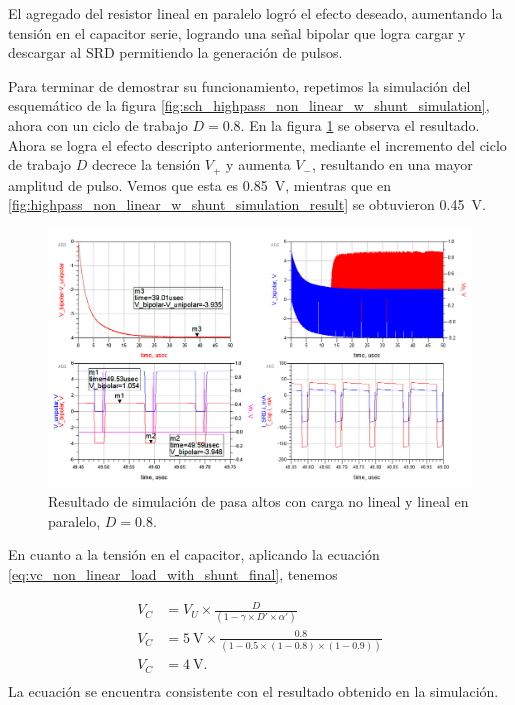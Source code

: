 El agregado del resistor lineal en paralelo logró el efecto deseado, aumentando
la tensión en el capacitor serie, logrando una señal bipolar que logra cargar y
descargar al SRD permitiendo la generación de pulsos.

Para terminar de demostrar su funcionamiento, repetimos la simulación del
esquemático de la figura \ref{fig:sch_highpass_non_linear_w_shunt_simulation},
ahora con un ciclo de trabajo $D=0.8$. En la figura
\ref{fig:highpass_non_linear_w_shunt_simulation_result_80_dc} se observa el
resultado. Ahora se logra el efecto descripto anteriormente, mediante el
incremento del ciclo de trabajo $D$ decrece la tensión $V_{+}$ y aumenta
$V_{-}$, resultando en una mayor amplitud de pulso. Vemos que esta es
\qty{0.85}{\volt}, mientras que en
\ref{fig:highpass_non_linear_w_shunt_simulation_result} se obtuvieron
\qty{0.45}{\volt}.

\begin{figure}[tbp]
    \centering
    \includegraphics[width=\textwidth]{images/highpass_nonlinear_w_shunt_sim_result_80_dc.png}
    \caption{Resultado de simulación de pasa altos con carga no lineal y lineal
    en paralelo, $D=0.8$.}
    \label{fig:highpass_non_linear_w_shunt_simulation_result_80_dc}
\end{figure}

En cuanto a la tensión en el capacitor, aplicando la ecuación
\ref{eq:vc_non_linear_load_with_shunt_final}, tenemos

\begin{equation}
    \begin{aligned}
        V_C &= V_U \times \frac{D}{\left( 1 - \gamma \times D' \times \alpha'\right)} \\
        V_C &= \qty{5}{\volt} \times \frac{0.8}{\left( 1 - 0.5 \times (1-0.8)
        \times (1-0.9) \right)} \\
        V_C &= \qty{4}{\volt}. \\
    \end{aligned}
\end{equation}
La ecuación se encuentra consistente con el resultado obtenido en la simulación.

